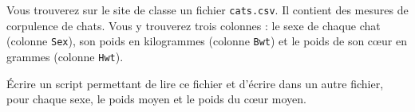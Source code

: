 Vous trouverez sur le site de classe un fichier \texttt{cats.csv}.
Il contient des mesures de corpulence de chats. 
Vous y trouverez trois colonnes : le sexe de chaque chat (colonne \texttt{Sex}), son poids en kilogrammes (colonne \texttt{Bwt}) et le poids de son cœur en grammes (colonne \texttt{Hwt}). 

Écrire un script \python{} permettant de lire ce fichier et d'écrire dans un autre fichier, pour chaque sexe, le poids moyen et le poids du cœur moyen. 
